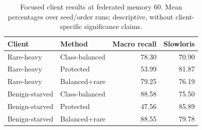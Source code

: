\begin{table}[t]
\centering
\caption{Focused client results at federated memory 60. Mean percentages over seed/order runs; descriptive, without client-specific significance claims.}
\label{tab:clients}
\footnotesize
\begin{tabular}{llrr}
\toprule
Client & Method & Macro recall & Slowloris\\
\midrule
Rare-heavy & Class-balanced & 78.30 & 70.90\\
Rare-heavy & Protected & 53.99 & 81.87\\
Rare-heavy & Balanced+rare & 79.25 & 76.19\\
Benign-starved & Class-balanced & 88.58 & 75.50\\
Benign-starved & Protected & 47.56 & 85.89\\
Benign-starved & Balanced+rare & 88.55 & 79.78\\
\bottomrule
\end{tabular}
\end{table}
